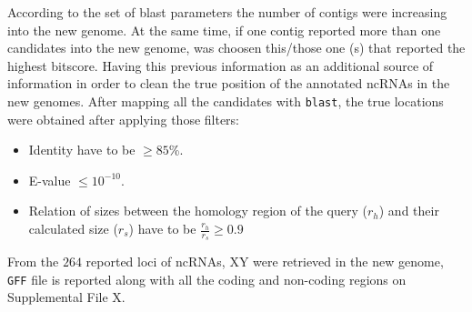 \documentclass[11pt]{article}
\begin{document}
According to the set of blast parameters the number of contigs were increasing
into the new genome. At the same time, if one contig reported more than one
candidates into the new genome, was choosen this/those one (s) that reported the 
highest bitscore. Having this previous information as an additional source of 
information in order to clean the true position of the annotated ncRNAs in the
new genomes. After mapping all the candidates with \texttt{blast}, the true locations
were obtained after applying those filters:
\begin{itemize}
 \item Identity have to be $\geq 85$\%.
 \item E-value $\leq 10^{-10}$.
 \item Relation of sizes between the homology region of the query
  ($r_h$) and their calculated size ($r_s$) have to be $\frac{r_h}{r_s} \geq 0.9$
\end{itemize}

From the $264$ reported loci of ncRNAs, XY were retrieved in the
new genome, \texttt{GFF} file is reported along with all the coding and non-coding
regions on Supplemental File X.
\end{document}

